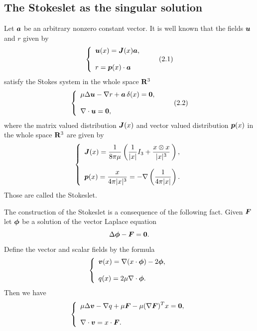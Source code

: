 \subsection{The Stokeslet as the singular solution}






 

Let $\mbox{\boldmath $a$}$ be  an arbitrary nonzero constant vector.
It is well known that the fields $\mbox{\boldmath $u$}$ and $r$ given by
$$
\left\{\begin{array}{l}
\displaystyle
\mbox{\boldmath $u$}(x)
=\mbox{\boldmath $J$}(x)\mbox{\boldmath $a$},\\
\\
\displaystyle
r=\mbox{\boldmath $p$}(x)\cdot\mbox{\boldmath $a$}
\end{array}
\right.
\tag {2.1}
$$
satisfy the Stokes system
in the whole space $\Bbb R^3$
$$
\left\{
\begin{array}{l}
\displaystyle
\mu\Delta\mbox{\boldmath $u$}-\nabla r+\mbox{\boldmath $a$}\,\delta(x)
=\mbox{\boldmath $0$},\\
\\
\displaystyle
\nabla\cdot\mbox{\boldmath $u$}=\mbox{\boldmath $0$},
\end{array}
\right.
\tag {2.2}
$$
where the matrix valued distribution $\mbox{\boldmath $J$}(x)$ and vector valued distribution $\mbox{\boldmath $p$}(x)$ in the whole space $\Bbb R^3$ are given by
$$\left\{
\begin{array}{l}
\displaystyle
\mbox{\boldmath $J$}(x)=
\frac{1}{8\pi\mu}
\left(\frac{1}{\vert x\vert}I_3+\frac{x\otimes x}{\vert x\vert^3}\,\right),
\\
\\
\displaystyle
\mbox{\boldmath $p$}(x)=\frac{x}{4\pi\vert x\vert^3}=-\nabla\left(\frac{1}{4\pi\vert x\vert}\right).
\end{array}
\right.
$$
Those are called the Stokeslet.



The construction of the Stokeslet is a consequence of the following fact.
Given $\mbox{\boldmath $F$}$ let $\mbox{\boldmath $\phi$}$ be a solution of the vector Laplace equation
$$\displaystyle
\Delta\mbox{\boldmath $\phi$}-\mbox{\boldmath $F$}=\mbox{\boldmath $0$}.
$$
Define the vector and scalar fields by the formula
$$
\left\{
\begin{array}{l}
\displaystyle
\mbox{\boldmath $v$}(x)=\nabla(x\cdot\mbox{\boldmath $\phi$})-2\mbox{\boldmath $\phi$},
\\
\\
\displaystyle
q(x)=2\mu\nabla\cdot\mbox{\boldmath $\phi$}.
\end{array}
\right.
$$
Then we have
$$
\left\{
\begin{array}{l}
\displaystyle
\mu\Delta\mbox{\boldmath $v$}-\nabla q+\mu\mbox{\boldmath $F$}-\mu(\nabla\mbox{\boldmath $F$})^Tx=\mbox{\boldmath $0$},
\\
\\
\displaystyle
\nabla\cdot\mbox{\boldmath $v$}=x\cdot\mbox{\boldmath $F$}.
\end{array}
\right.
$$
\endproclaim

